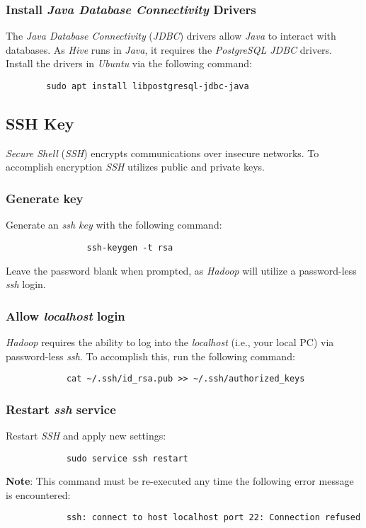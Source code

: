 \documentclass{article}
\begin{document}
    \subsubsection{Install \emph{Java Database Connectivity} Drivers}
    The \emph{Java Database Connectivity} (\emph{JDBC}) drivers allow \emph{Java} to interact with
    databases. As \emph{Hive} runs in \emph{Java}, it requires the \emph{PostgreSQL JDBC} drivers.
    Install the drivers in \emph{Ubuntu} via the following command:
    \begin{verbatim}
        sudo apt install libpostgresql-jdbc-java
    \end{verbatim}

    \subsection{SSH Key}
    \emph{Secure Shell} (\emph{SSH}) encrypts communications over insecure networks. To accomplish encryption
    \emph{SSH} utilizes public and private keys.

        \subsubsection{Generate key}
        Generate an \emph{ssh key} with the following command:
            \begin{verbatim}
                ssh-keygen -t rsa
            \end{verbatim}
        Leave the password blank when prompted, as \emph{Hadoop} will utilize a password-less \emph{ssh}
        login.

        \subsubsection{Allow \emph{localhost} login}
        \emph{Hadoop} requires the ability to log into the \emph{localhost} (i.e., your local PC) via
        password-less \emph{ssh}. To accomplish this, run the following command:
        \begin{verbatim}
            cat ~/.ssh/id_rsa.pub >> ~/.ssh/authorized_keys
        \end{verbatim}

        \subsubsection{Restart \emph{ssh} service}
        \label{subsec:sshrestart}
        Restart \emph{SSH} and apply new settings:
        \begin{verbatim}
            sudo service ssh restart
        \end{verbatim}
        \textbf{Note}: This command must be re-executed any time the following error message is encountered:
        \begin{verbatim}
            ssh: connect to host localhost port 22: Connection refused
        \end{verbatim}
\end{document}
